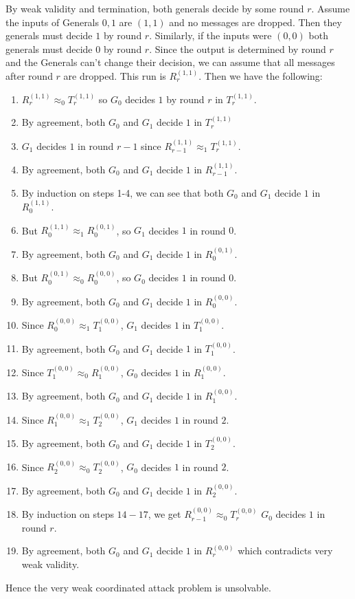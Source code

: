 \documentclass[12pt]{article}
\begin{document}
\begin{solution}
    By weak validity and termination, both generals decide by some round $r$. 
    Assume the inputs of Generals $0,1$ are $(1,1)$ and no messages are dropped. Then they generals must decide $1$ by round $r$. Similarly, if the inputs were $(0,0)$ both generals must decide $0$ by round $r$. Since the output is determined by round $r$ and the Generals can't change their decision, we can assume that all messages after round $r$ are dropped. This run is $R_r^{(1,1)}$. Then we have the following: 
    \begin{enumerate}
        \item  $R_{r}^{(1,1)} \approx_0 T_r^{(1,1)}$ so $G_0$ decides $1$ by round $r$ in $T_r^{(1,1)}$. 
        \item By agreement, both $G_0$ and $G_1$ decide $1$ in $T_r^{(1,1)}$
        \item $G_1$ decides $1$ in round $r-1$ since $R_{r-1}^{(1,1)} \approx_1 T_r^{(1,1)}$.
        \item By agreement, both $G_0$ and $G_1$ decide $1$ in $R_{r-1}^{(1,1)}$.
        \item By induction on steps 1-4, we can see that both $G_0$ and $G_1$ decide $1$ in $R_0^{(1,1)}$.
        \item But $R_0^{(1,1)} \approx_1 R_0^{(0,1)}$, so $G_1$ decides $1$ in round $0$.
        \item By agreement, both $G_0$ and $G_1$ decide $1$ in $R_{0}^{(0,1)}$.
        \item But $R_0^{(0,1)} \approx_0 R_0^{(0,0)}$, so $G_0$ decides $1$ in round $0$. 
        \item By agreement, both $G_0$ and $G_1$ decide $1$ in $R_{0}^{(0,0)}$.
        \item Since $R_0^{(0,0)} \approx_1 T_1^{(0,0)}$, $G_1$ decides $1$ in $T_1^{(0,0)}$. 
        \item By agreement, both $G_0$ and $G_1$ decide $1$ in $T_{1}^{(0,0)}$.
        \item Since $T_1^{(0,0)} \approx_0 R_1^{(0,0)}$, $G_0$ decides $1$ in $R_1^{(0,0)}$.
        \item By agreement, both $G_0$ and $G_1$ decide $1$ in $R_{1}^{(0,0)}$.
        \item Since $R_1^{(0,0)} \approx_1 T_2^{(0,0)}$, $G_1$ decides $1$ in round $2$. 
        \item By agreement, both $G_0$ and $G_1$ decide $1$ in $T_{2}^{(0,0)}$.
        \item Since $R_2^{(0,0)} \approx_0 T_2^{(0,0)}$, $G_0$ decides $1$ in round $2$. 
        \item By agreement, both $G_0$ and $G_1$ decide $1$ in $R_{2}^{(0,0)}$.
        \item By induction on steps $14-17$, we get $R_{r-1}^{(0,0)} \approx_0 T_r^{(0,0)}$ $G_0$ decides $1$ in round $r$. 
        \item By agreement, both $G_0$ and $G_1$ decide $1$ in $R_{r}^{(0,0)}$ which contradicts very weak validity. 
    \end{enumerate}
    Hence the very weak coordinated attack problem is unsolvable. 
\end{solution}
\end{document}
